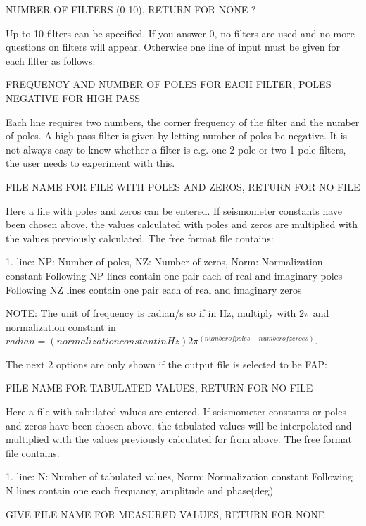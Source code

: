 NUMBER OF FILTERS (0-10), RETURN FOR NONE ? 

Up to 10 filters can be specified. If you answer 0, no filters are used and no more questions on filters will appear. Otherwise one line of input must be given for each filter as follows: 

FREQUENCY AND NUMBER OF POLES FOR EACH FILTER, \newline
POLES NEGATIVE FOR HIGH PASS 

Each line requires two numbers, the corner frequency of the filter and the number of poles. A high pass filter is given by letting number of poles be negative. It is not always easy to know whether a filter is e.g. one 2 pole or two 1 pole filters, the user needs to experiment with this. 

FILE NAME FOR FILE WITH POLES AND ZEROS, RETURN FOR NO FILE

Here a file with poles and zeros can be entered. If seismometer constants have been chosen above, the values calculated with poles and zeros are multiplied with the values previously calculated. The free format file contains: 

1. line: NP: Number of poles, NZ: Number of zeros, Norm: Normalization constant \newline
Following NP lines contain one pair each of real and imaginary poles \newline
Following NZ lines contain one pair each of real and imaginary zeros 

NOTE: The unit of frequency is radian/s so if in Hz, multiply with 
$2\pi$ and normalization constant in 
$radian = (normalization constant in Hz) 2\pi^{(number of poles-number of zeroes)}$. 

The next 2 options are only shown if the output file is selected to be FAP: 

FILE NAME FOR TABULATED VALUES, RETURN FOR NO FILE  

Here a file with tabulated values are entered. If seismometer constants or poles and zeros have been chosen above, the tabulated values will be interpolated and multiplied with the values previously calculated for from above. The free format file contains: 

1. line: N: Number of tabulated values, Norm: Normalization constant \newline
Following N lines contain one each frequancy, amplitude and phase(deg) 

GIVE FILE NAME FOR MEASURED VALUES, RETURN FOR NONE 


